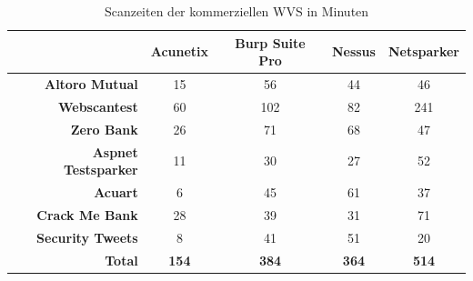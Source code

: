 \documentclass[12pt,oneside,a4paper,parskip,pointlessnumbers]{scrbook}
\begin{document}
\begin{table}[H]
\begin{tabular}{|r|c|c|c|c|}
\hline
                       & \textbf{Acunetix} & \textbf{Burp Suite Pro} & \textbf{Nessus} & \textbf{Netsparker}  \\
\hline
\textbf{Altoro Mutual}      & 15                & 56                      & 44              & 46                   \\
\hline
\textbf{Webscantest}        & 60                & 102                     & 82              & 241                  \\
\hline
\textbf{Zero Bank}          & 26                & 71                      & 68              & 47                   \\
\hline
\textbf{Aspnet Testsparker} & 11                & 30                      & 27              & 52                   \\
\hline
\textbf{Acuart}             & 6                 & 45                      & 61              & 37                   \\
\hline
\textbf{Crack Me Bank}      & 28                & 39                      & 31              & 71                   \\
\hline
\textbf{Security Tweets}    & 8                 & 41                      & 51              & 20                   \\
\hline
\textbf{Total}              & \textbf{154}      & \textbf{384}            & \textbf{364}    & \textbf{514}         \\
\hline
\end{tabular}
\caption[Scanzeiten der kommerziellen WVS in Minuten]{Scanzeiten der kommerziellen WVS in Minuten}
\end{table}
\end{document}
